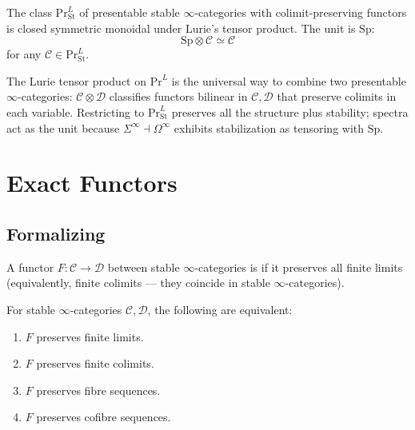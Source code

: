 \begin{theorem}
\label{thm:prl-st}
The class $\mathrm{Pr}^L_{\mathrm{St}}$ of presentable stable
$\infty$-categories with colimit-preserving functors is closed symmetric
monoidal under Lurie's tensor product. The unit is $\mathrm{Sp}$:
\begin{equation*}
  \mathrm{Sp} \otimes \mathcal{C} \simeq \mathcal{C}
\end{equation*}
for any $\mathcal{C} \in \mathrm{Pr}^L_{\mathrm{St}}$.
\end{theorem}

\begin{remark}
The Lurie tensor product on $\mathrm{Pr}^L$ is the universal way to
combine two presentable $\infty$-categories: $\mathcal{C} \otimes \mathcal{D}$
classifies functors bilinear in $\mathcal{C}, \mathcal{D}$ that preserve
colimits in each variable. Restricting to $\mathrm{Pr}^L_{\mathrm{St}}$
preserves all the structure plus stability; spectra act as the unit
because $\Sigma^\infty \dashv \Omega^\infty$ exhibits stabilization
as tensoring with $\mathrm{Sp}$.
\end{remark}


\section{Exact Functors}
\label{sec:exact-functors}

\subsection{Formalizing}

\begin{definition}
\label{def:exact-functor}
A functor $F : \mathcal{C} \to \mathcal{D}$ between stable $\infty$-categories
is  if it preserves all finite limits (equivalently, finite
colimits — they coincide in stable $\infty$-categories).
\end{definition}

\begin{theorem}[Exact = colimit-preserving on finite limits]
\label{thm:exact-equivalent}
For stable $\infty$-categories $\mathcal{C}, \mathcal{D}$, the following are equivalent:
\begin{enumerate}
  \item $F$ preserves finite limits.
  \item $F$ preserves finite colimits.
  \item $F$ preserves fibre sequences.
  \item $F$ preserves cofibre sequences.
\end{enumerate}
\end{theorem}

